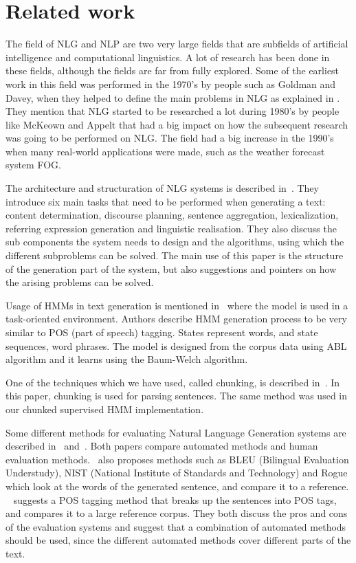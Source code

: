 \documentclass[a4paper,12pt]{article}
\begin{document}
\section{Related work}
\label{sec:relwork}

The field of NLG and NLP are two very large fields that are subfields of
artificial intelligence and computational linguistics. A lot of research has
been done in these fields, although the fields are far from fully explored. Some
of the earliest work in this field was performed in the 1970's by people such as
Goldman and Davey, when they helped to define the main problems in NLG 
as explained in \cite[p.~19-20]{buildingNLG}. They mention that NLG
started to be researched a lot during 1980's by people like McKeown and Appelt
that had a big impact on how the subsequent research was going to be performed on NLG.
The field had a big increase in the 1990's when many real-world
applications were made, such as the weather forecast system FOG.

The architecture and structuration of NLG systems is described
in~\cite{nlgsystem01}. They introduce six main tasks that need to be performed
when generating a text: content determination, discourse planning, sentence
aggregation, lexicalization, referring expression generation and linguistic
realisation. They also discuss the sub components the system needs to design and
the algorithms, using which the different subproblems can be solved. The main
use of this paper is the structure of the generation part of the system, but
also suggestions and pointers on how the arising problems can be solved.

Usage of HMMs in text generation is mentioned in~\cite{hmmnlg} where the model
is used in a task-oriented environment. Authors describe HMM generation process
to be very similar to POS (part of speech) tagging. States represent words, and
state sequences, word phrases. The model is designed from the corpus data
using ABL algorithm and it learns using the Baum-Welch algorithm.

One of the techniques which we have used, called chunking, is described
in~\cite{hmmchunk}. In this paper, chunking is used for parsing sentences. The
same method was used in our chunked supervised HMM implementation.

Some different methods for evaluating Natural Language Generation systems are
described in~\cite{poseval} and~\cite{bleueval}. Both papers compare automated
methods and human evaluation methods.~\cite{bleueval} also proposes methods such
as BLEU (Bilingual Evaluation Understudy), NIST (National Institute of Standards
and Technology) and Rogue which look at the words of the generated sentence, and
compare it to a reference. ~\cite{poseval} suggests a POS tagging method that
breaks up the sentences into POS tags, and compares it to a large reference
corpus. They both discuss the pros and cons of the evaluation systems and
suggest that a combination of automated methods should be used, since the
different automated methods cover different parts of the text.
\end{document}
